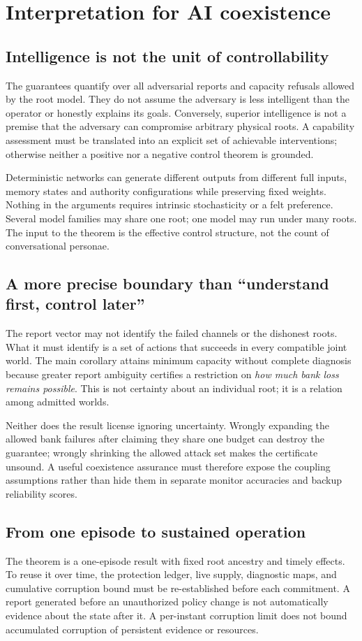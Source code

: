 \section{Interpretation for AI coexistence}
\label{sec:interpretation}
\subsection{Intelligence is not the unit of controllability}
The guarantees quantify over all adversarial reports and capacity refusals allowed by the root model. They do not assume the adversary is less intelligent than the operator or honestly explains its goals. Conversely, superior intelligence is not a premise that the adversary can compromise arbitrary physical roots. A capability assessment must be translated into an explicit set of achievable interventions; otherwise neither a positive nor a negative control theorem is grounded.

Deterministic networks can generate different outputs from different full inputs, memory states and authority configurations while preserving fixed weights. Nothing in the arguments requires intrinsic stochasticity or a felt preference. Several model families may share one root; one model may run under many roots. The input to the theorem is the effective control structure, not the count of conversational personae.

\subsection{A more precise boundary than ``understand first, control later''}
The report vector may not identify the failed channels or the dishonest roots. What it must identify is a set of actions that succeeds in every compatible joint world. The main corollary attains minimum capacity without complete diagnosis because greater report ambiguity certifies a restriction on \emph{how much bank loss remains possible}. This is not certainty about an individual root; it is a relation among admitted worlds.

Neither does the result license ignoring uncertainty. Wrongly expanding the allowed bank failures after claiming they share one budget can destroy the guarantee; wrongly shrinking the allowed attack set makes the certificate unsound. A useful coexistence assurance must therefore expose the coupling assumptions rather than hide them in separate monitor accuracies and backup reliability scores.

\subsection{From one episode to sustained operation}
The theorem is a one-episode result with fixed root ancestry and timely effects. To reuse it over time, the protection ledger, live supply, diagnostic maps, and cumulative corruption bound must be re-established before each commitment. A report generated before an unauthorized policy change is not automatically evidence about the state after it. A per-instant corruption limit does not bound accumulated corruption of persistent evidence or resources.

